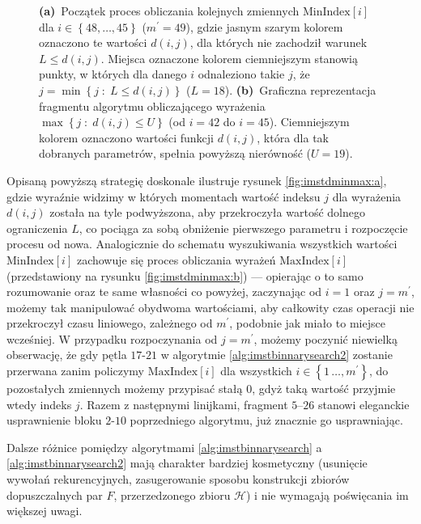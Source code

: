 {\begin{figure}[!htbp]
{		\textbf{(a)}~Początek proces obliczania kolejnych zmiennych $\text{MinIndex} \left[ i \right]$ dla $i \in \left\{ 48, \dots, 45 \right\}$ ($m^{\prime} = 49$), gdzie jasnym szarym kolorem oznaczono te wartości $d \left( i, j \right)$, dla których nie zachodził warunek $L \leqslant d \left( i, j \right)$. Miejsca oznaczone kolorem ciemniejszym stanowią punkty, w których dla danego $i$ odnaleziono takie $j$, że $j = \min \left\{ j \; : \; L \leqslant d \left( i, j \right) \right\}$ ($L = 18$).
		\textbf{(b)}~Graficzna reprezentacja fragmentu algorytmu obliczającego wyrażenia $\max \left\{ j \; : \; d \left( i, j \right) \leqslant U \right\}$ (od $i = 42$ do $i = 45$). Ciemniejszym kolorem oznaczono wartości funkcji $d \left( i, j \right)$, która dla tak dobranych parametrów, spełnia powyższą nierówność ($U = 19$).
	}
	\label{fig:imstdminmax}
\end{figure}

Opisaną powyższą strategię doskonale ilustruje rysunek \ref{fig:imstdminmax:a}, gdzie wyraźnie widzimy w których momentach wartość indeksu $j$ dla wyrażenia $d \left( i, j \right)$ została na tyle podwyższona, aby przekroczyła wartość dolnego ograniczenia $L$, co pociąga za sobą obniżenie pierwszego parametru i rozpoczęcie procesu od nowa. Analogicznie do schematu wyszukiwania wszystkich wartości $\text{MinIndex} \left[ i \right]$ zachowuje się proces obliczania wyrażeń $\text{MaxIndex} \left[ i \right]$ (przedstawiony na rysunku \ref{fig:imstdminmax:b}) --- opierając o to samo rozumowanie oraz te same własności co powyżej, zaczynając od $i = 1$ oraz $j = m^{\prime}$, możemy tak manipulować obydwoma wartościami, aby całkowity czas operacji nie przekroczył czasu liniowego, zależnego od $m^{\prime}$, podobnie jak miało to miejsce wcześniej. W przypadku rozpoczynania od $j = m^{\prime}$, możemy poczynić niewielką obserwację, że gdy pętla $17$-$21$ w algorytmie \ref{alg:imstbinnarysearch2} zostanie przerwana zanim policzymy $\text{MaxIndex} \left[ i \right]$ dla wszystkich $i \in \left\{ 1\, \dots, m^{\prime} \right\}$, do pozostałych zmiennych możemy przypisać stałą $0$, gdyż taką wartość przyjmie wtedy indeks $j$. Razem z następnymi linijkami, fragment $5$--$26$ stanowi eleganckie usprawnienie bloku $2$-$10$ poprzedniego algorytmu, już znacznie go usprawniając.

Dalsze różnice pomiędzy algorytmami \ref{alg:imstbinnarysearch} a \ref{alg:imstbinnarysearch2} mają charakter bardziej kosmetyczny (usunięcie wywołań rekurencyjnych, zasugerowanie sposobu konstrukcji zbiorów dopuszczalnych par $F$, przerzedzonego zbioru $\mathcal{H}$) i nie wymagają poświęcania im większej uwagi.

}
